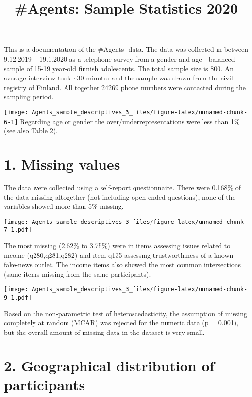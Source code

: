 \documentclass[
]{article}
\title{\#Agents: Sample Statistics 2020}
\author{}
\date{\vspace{-2.5em}}
\begin{document}
\maketitle

This is a documentation of the \#Agents -data. The data was collected in
between 9.12.2019 -- 19.1.2020 as a telephone survey from a gender and
age - balanced sample of 15-19 year-old finnish adolescents. The total
sample size is 800. An average interview took \textasciitilde30 minutes
and the sample was drawn from the civil registry of Finland. All
together 24269 phone numbers were contacted during the sampling period.

\texttt{[image: Agents\_sample\_descriptives\_3\_files/figure-latex/unnamed-chunk-6-1]}
Regarding age or gender the over/underrepresentations were less than 1\%
(see also Table 2).

\newpage

\hypertarget{missing-values}{%
\section{1. Missing values}\label{missing-values}}

The data were collected using a self-report questionnaire. There were
0.168\% of the data missing altogether (not including open ended
questions), none of the variables showed more than 5\% missing.

\texttt{[image: Agents\_sample\_descriptives\_3\_files/figure-latex/unnamed-chunk-7-1.pdf]}

The most missing (2.62\% to 3.75\%) were in items assessing issues
related to income (q280,q281,q282) and item q135 assessing
trustworthiness of a known fake-news outlet. The income items also
showed the most common intersections (same items missing from the same
participants).

\texttt{[image: Agents\_sample\_descriptives\_3\_files/figure-latex/unnamed-chunk-9-1.pdf]}

Based on the non-parametric test of heteroscedasticity, the assumption
of missing completely at random (MCAR) was rejected for the numeric data
(p = 0.001), but the overall amount of missing data in the dataset is
very small.

\hypertarget{geographical-distribution-of-participants}{%
\section{2. Geographical distribution of
participants}\label{geographical-distribution-of-participants}}
\end{document}
